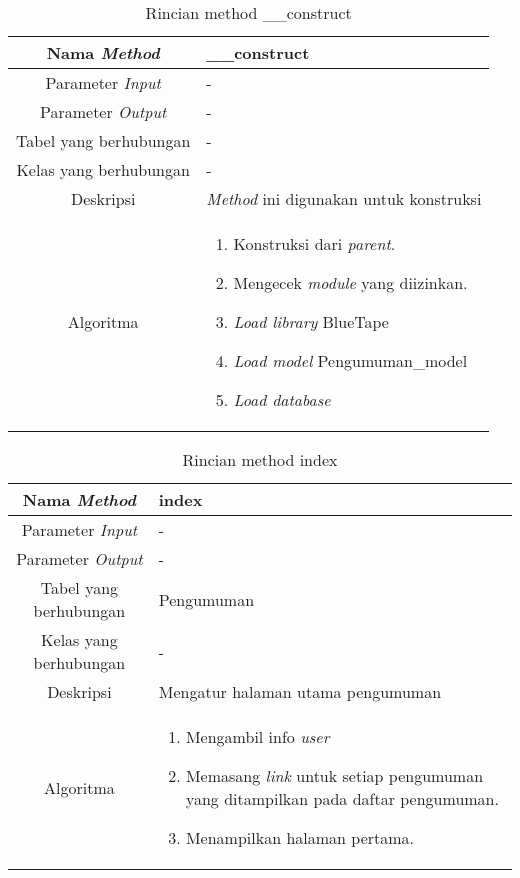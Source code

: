 \begin{center}
	\begin{table}[H]
	\caption{Rincian method \_\_construct}
	\label{table:pengumuman-construct}
\begin{tabular}{|c|p{11cm}|}
\hline
Nama \textit{Method} 	& 	 	\_\_construct \\
\hline
Parameter \textit{Input} & - \\
\hline
Parameter \textit{Output} & - \\
\hline
Tabel yang berhubungan & -\\
\hline
Kelas yang berhubungan &  - \\
\hline
Deskripsi	& \textit{Method} ini digunakan untuk konstruksi\\
\hline
Algoritma	& \begin{enumerate}
				\item Konstruksi dari \textit{parent}.
				\item Mengecek \textit{module} yang diizinkan.
				\item \textit{Load library} BlueTape
				\item \textit{Load model} Pengumuman\_model
				\item \textit{Load database}
				\end{enumerate} \\
\hline
\end{tabular}
\end{table}
\end{center}

\begin{center}
	\begin{table}[H]
	\caption{Rincian method index}
	\label{table:pengumuman-index}
\begin{tabular}{|c|p{11cm}|}
\hline
Nama \textit{Method} 	& 	 index	\\
\hline
Parameter \textit{Input} & - \\
\hline
Parameter \textit{Output} & - \\
\hline
Tabel yang berhubungan & Pengumuman \\
\hline
Kelas yang berhubungan & - \\
\hline
Deskripsi	& Mengatur halaman utama pengumuman\\
\hline
Algoritma	& \begin{enumerate}
				\item Mengambil info \textit{user}
				\item Memasang \textit{link} untuk setiap pengumuman yang ditampilkan pada daftar pengumuman.
				\item Menampilkan halaman pertama.
				\end{enumerate} \\
\hline
\end{tabular}
\end{table}
\end{center}


